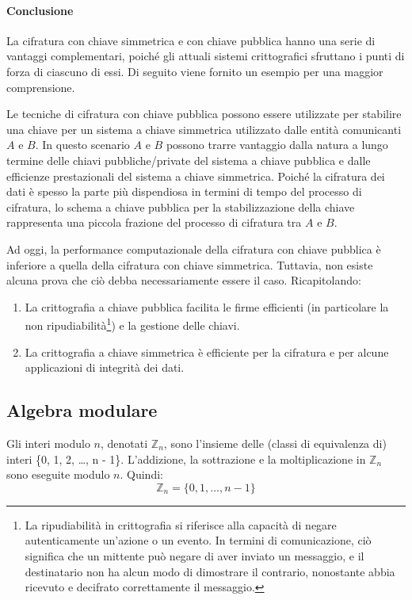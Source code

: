 \documentclass{article}
\theoremstyle{definition}
\begin{document}
\paragraph{Conclusione}
La cifratura con chiave simmetrica e con chiave pubblica hanno una serie di vantaggi complementari, poiché gli attuali sistemi crittografici sfruttano i punti di forza di ciascuno di essi. Di seguito viene fornito un esempio per una maggior comprensione.

Le tecniche di cifratura con chiave pubblica possono essere utilizzate per stabilire una chiave per un sistema a chiave simmetrica utilizzato dalle entità comunicanti \( A \) e \( B \). In questo scenario \( A \) e \( B \) possono trarre vantaggio dalla natura a lungo termine delle chiavi pubbliche/private del sistema a chiave pubblica e dalle efficienze prestazionali del sistema a chiave simmetrica. Poiché la cifratura dei dati è spesso la parte più dispendiosa in termini di tempo del processo di cifratura, lo schema a chiave pubblica per la stabilizzazione della chiave rappresenta una piccola frazione del processo di cifratura tra \( A \) e \( B \).

Ad oggi, la performance computazionale della cifratura con chiave pubblica è inferiore a quella della cifratura con chiave simmetrica. Tuttavia, non esiste alcuna prova che ciò debba necessariamente essere il caso. Ricapitolando:
\begin{enumerate}
    \item La crittografia a chiave pubblica facilita le firme efficienti (in particolare la non ripudiabilità\footnote{La ripudiabilità in crittografia si riferisce alla capacità di negare autenticamente un'azione o un evento. In termini di comunicazione, ciò significa che un mittente può negare di aver inviato un messaggio, e il destinatario non ha alcun modo di dimostrare il contrario, nonostante abbia ricevuto e decifrato correttamente il messaggio.}) e la gestione delle chiavi.
    \item La crittografia a chiave simmetrica è efficiente per la cifratura e per alcune applicazioni di integrità dei dati.
\end{enumerate}

\subsection{Algebra modulare}
Gli interi modulo \( n \), denotati \( \mathbb{Z}_n \), sono l'insieme delle (classi di equivalenza di) interi \{0, 1, 2, \ldots, n - 1\}. L'addizione, la sottrazione e la moltiplicazione in \( \mathbb{Z}_n \) sono eseguite modulo \( n \). Quindi:
\begin{equation*}
    \mathbb{Z}_n = \{0,1,\dots ,n-1\}
\end{equation*}
\end{document}
